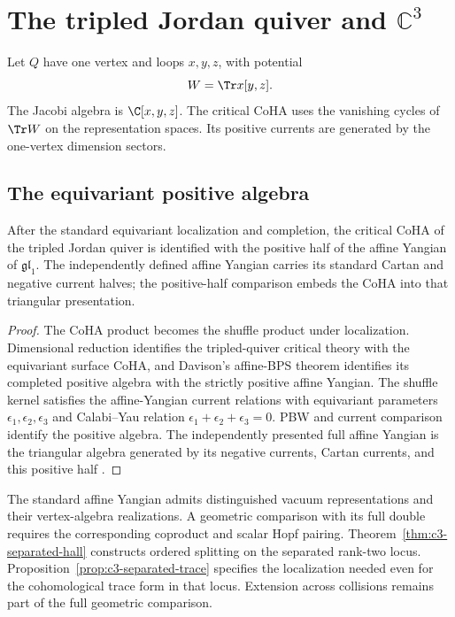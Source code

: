 \chapter{The tripled Jordan quiver and \texorpdfstring{$\mathbb C^3$}{C3}}
Let $Q$ have one vertex and loops $x,y,z$, with potential
\[
 W=\Tr x[y,z].
\]
The Jacobi algebra is $\C[x,y,z]$. The critical CoHA uses the vanishing cycles of $\Tr W$ on the representation spaces. Its positive currents are generated by the one-vertex dimension sectors.



\section{The equivariant positive algebra}

\begin{theorem}
After the standard equivariant localization and completion, the critical CoHA of the tripled Jordan quiver is identified with the positive half of the affine Yangian of $\mathfrak{gl}_1$. The independently defined affine Yangian carries its standard Cartan and negative current halves; the positive-half comparison embeds the CoHA into that triangular presentation.
\end{theorem}
\begin{proof}
The CoHA product becomes the shuffle product under localization. Dimensional reduction identifies the tripled-quiver critical theory with the equivariant surface CoHA, and Davison's affine-BPS theorem identifies its completed positive algebra with the strictly positive affine Yangian. The shuffle kernel satisfies the affine-Yangian current relations with equivariant parameters $\epsilon_1,\epsilon_2,\epsilon_3$ and Calabi--Yau relation $\epsilon_1+\epsilon_2+\epsilon_3=0$. PBW and current comparison identify the positive algebra. The independently presented full affine Yangian is the triangular algebra generated by its negative currents, Cartan currents, and this positive half \cite{DavisonAffineBPS,DavisonMeinhardt,SVYangians,Tsymbaliuk}.
\end{proof}

The standard affine Yangian admits distinguished vacuum representations
and their vertex-algebra realizations. A geometric comparison with its
full double requires the corresponding coproduct and scalar Hopf pairing.
Theorem~\ref{thm:c3-separated-hall} constructs ordered splitting on the
separated rank-two locus. Proposition~\ref{prop:c3-separated-trace}
specifies the localization needed even for the cohomological trace form
in that locus. Extension across collisions remains part of the full
geometric comparison.

